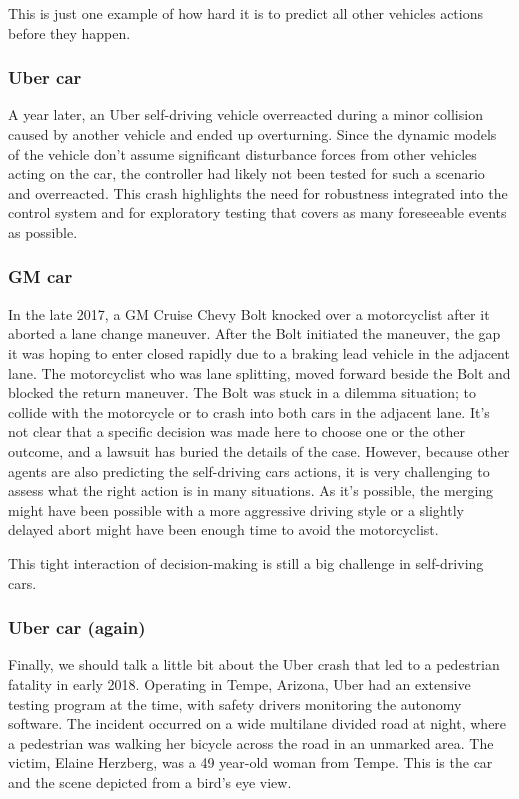 This is just one example of how hard it is to predict all other vehicles actions before they happen. 


\subsubsection{Uber car}
A year later, an Uber self-driving vehicle overreacted during a minor collision caused by another vehicle and ended up overturning. 
Since the dynamic models of the vehicle don't assume significant disturbance forces from other vehicles acting on the car, 
the controller had likely not been tested for such a scenario and overreacted. 
This crash highlights the need for robustness integrated into the control system and for exploratory testing that covers as many foreseeable events as possible. 

\subsubsection{GM car}

In the late 2017, a GM Cruise Chevy Bolt knocked over a motorcyclist after it aborted a lane change maneuver. 
After the Bolt initiated the maneuver, the gap it was hoping to enter closed rapidly due to a braking lead vehicle in the adjacent lane. 
The motorcyclist who was lane splitting, moved forward beside the Bolt and blocked the return maneuver. 
The Bolt was stuck in a dilemma situation; to collide with the motorcycle or to crash into both cars in the adjacent lane. 
It's not clear that a specific decision was made here to choose one or the other outcome, and a lawsuit has buried the details of the case. 
However, because other agents are also predicting the self-driving cars actions, it is very challenging to assess what the right action is in many situations. 
As it's possible, the merging might have been possible with a more aggressive driving style or a slightly delayed abort might have been enough time to avoid the motorcyclist. 

This tight interaction of decision-making is still a big challenge in self-driving cars. 

\subsubsection{Uber car (again)}
Finally, we should talk a little bit about the Uber crash that led to a pedestrian fatality in early 2018. 
Operating in Tempe, Arizona, Uber had an extensive testing program at the time, with safety drivers monitoring 
the autonomy software. The incident occurred on a wide multilane divided road at night, 
where a pedestrian was walking her bicycle across the road in 
an unmarked area. 
The victim, Elaine Herzberg, was a 49 year-old woman from Tempe. 
This is the car and the scene depicted from a bird's eye view. 


